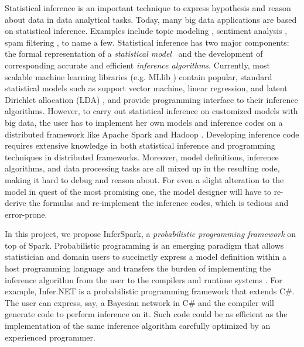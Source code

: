 \documentclass[a4paper,12pt,oneside,onecolumn,final]{book}
\newcommand{\stitle}[1]{\vspace*{0.5em}\noindent{\bf #1\/} }
\begin{document}


\newpage

\stitle {\underline{Proposed Outline of Research Plan and Methodology}}

\setcounter{page}{1}


Statistical inference is an important technique to express hypothesis and
reason about data in data analytical tasks.  
Today, many big data applications are based on
statistical inference.
Examples include topic modeling \cite{blei2003latent,Titov2008a},
sentiment analysis \cite{Titov2008b, Jo2011,tsm}, spam filtering \cite{spam}, to name a few.
Statistical inference has two major components: the formal
representation of a \emph{statistical model}~\cite{cox} and 
the development of corresponding accurate and efficient 
{\em inference algorithms}.
Currently, most scalable machine learning libraries (e.g. MLlib \cite{mllib}) 
contain popular, standard statistical models such as support vector machine, 
linear regression, and latent Dirichlet allocation (LDA) \cite{blei2003latent}, 
and provide programming interface to their inference algorithms.
However, to carry out statistical inference on
customized models with big data, the user has to implement her own models and
inference codes on a distributed framework like Apache Spark
\cite{Zaharia:2010:SCC:1863103.1863113} and Hadoop \cite{hadoop}.
Developing inference code requires extensive knowledge in both statistical
inference and programming techniques in distributed frameworks.  Moreover,
model definitions, inference algorithms, and data processing tasks are all
mixed up in the resulting code, making it hard to debug and reason about.  For
even a slight alteration to the model in quest of the most promising one, the
model designer will have to re-derive the formulas and re-implement the
inference codes, which is tedious and error-prone. 

In this project, we propose InferSpark, a \emph{probabilistic programming
framework} on top of Spark.  Probabilistic programming is an emerging
paradigm that allows statistician and domain users to succinctly express a model
definition within a host programming language and transfers the burden of
implementing the inference algorithm from the user to the compilers and
runtime systems \cite{pp}.  For example, Infer.NET \cite{InferNET14} is a
probabilistic programming framework that extends C\#.  The user can express,
say, a Bayesian network in C\# and the compiler will generate code to perform
inference on it. Such code could be as efficient as the implementation of
the same inference algorithm carefully optimized by
an experienced programmer.
\end{document}
